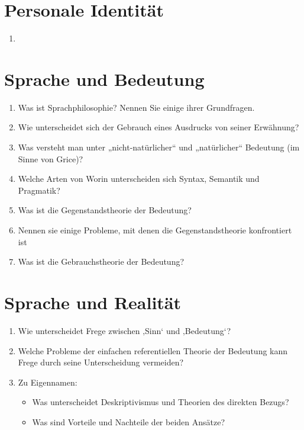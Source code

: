 \documentclass[../main.tex]{subfiles}
\begin{document}
\section{Personale Identität} %
\begin{enumerate}
	\item 
\end{enumerate}

\section{Sprache und Bedeutung}
\begin{enumerate}
	\item Was ist Sprachphilosophie? Nennen Sie einige ihrer Grundfragen.
	\item Wie unterscheidet sich der Gebrauch eines Ausdrucks von seiner Erwähnung?
	\item Was versteht man unter „nicht-natürlicher“ und „natürlicher“ Bedeutung (im Sinne von Grice)?
	\item Welche Arten von Worin unterscheiden sich Syntax, Semantik und Pragmatik?
	\item Was ist die Gegenstandstheorie der Bedeutung?
	\item Nennen sie einige Probleme, mit denen die Gegenstandstheorie konfrontiert ist
	\item Was ist die Gebrauchstheorie der Bedeutung?
\end{enumerate}

\section{Sprache und Realität} 
\begin{enumerate}
	\item Wie unterscheidet Frege zwischen ‚Sinn‘ und ‚Bedeutung‘?
	\item Welche Probleme der einfachen referentiellen Theorie der Bedeutung kann Frege durch seine Unterscheidung vermeiden?
	\item Zu Eigennamen:
	\begin{itemize}
		\item Was unterscheidet Deskriptivismus und Theorien des direkten Bezugs?
		\item Was sind Vorteile und Nachteile der beiden Ansätze?
	\end{itemize}
\end{enumerate}
\end{document}
